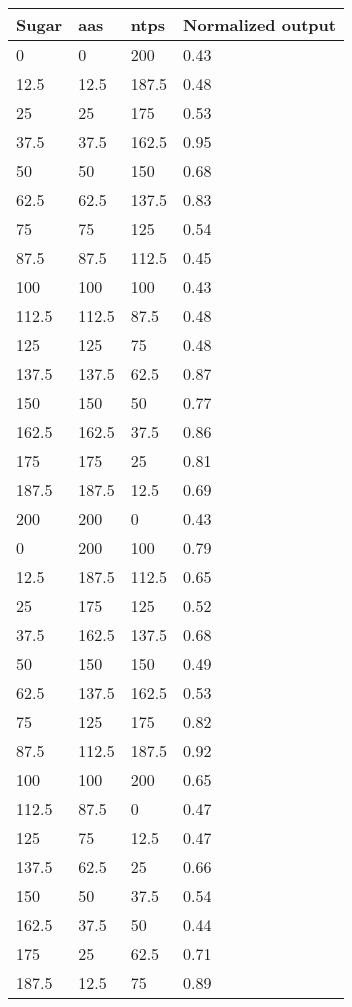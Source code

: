 \begin{longtable}{lll | l}
Sugar & \glspl{aa} & \glspl{ntp} & Normalized output   \\ \hline
0        & 0     & 200   & 0.43 \\
12.5     & 12.5  & 187.5 & 0.48 \\
25       & 25    & 175   & 0.53 \\
37.5     & 37.5  & 162.5 & 0.95 \\
50       & 50    & 150   & 0.68 \\
62.5     & 62.5  & 137.5 & 0.83 \\
75       & 75    & 125   & 0.54 \\
87.5     & 87.5  & 112.5 & 0.45 \\
100      & 100   & 100   & 0.43 \\
112.5    & 112.5 & 87.5  & 0.48 \\
125      & 125   & 75    & 0.48 \\
137.5    & 137.5 & 62.5  & 0.87 \\
150      & 150   & 50    & 0.77 \\
162.5    & 162.5 & 37.5  & 0.86 \\
175      & 175   & 25    & 0.81 \\
187.5    & 187.5 & 12.5  & 0.69 \\
200      & 200   & 0     & 0.43 \\
0        & 200   & 100   & 0.79 \\
12.5     & 187.5 & 112.5 & 0.65 \\
25       & 175   & 125   & 0.52 \\
37.5     & 162.5 & 137.5 & 0.68 \\
50       & 150   & 150   & 0.49 \\
62.5     & 137.5 & 162.5 & 0.53 \\
75       & 125   & 175   & 0.82 \\
87.5     & 112.5 & 187.5 & 0.92 \\
100      & 100   & 200   & 0.65 \\
112.5    & 87.5  & 0     & 0.47 \\
125      & 75    & 12.5  & 0.47 \\
137.5    & 62.5  & 25    & 0.66 \\
150      & 50    & 37.5  & 0.54 \\
162.5    & 37.5  & 50    & 0.44 \\
175      & 25    & 62.5  & 0.71 \\
187.5    & 12.5  & 75    & 0.89 \\

\end{longtable}
